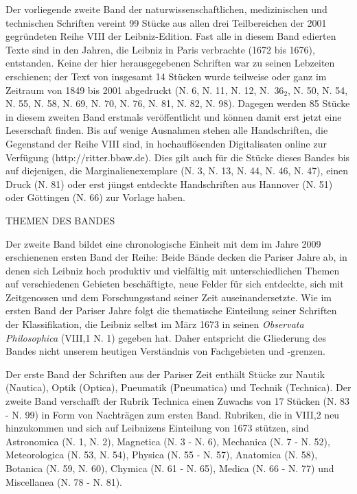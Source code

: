 \thispagestyle{empty}
{\vrule height 0mm depth 30mm width 0mm}
\vspace*{2em}
\par\noindent Der vorliegende zweite Band der naturwissenschaftlichen, medizinischen und technischen Schriften vereint 99 Stücke aus allen drei Teilbereichen der 2001 gegründeten Reihe VIII der Leibniz-Edition. Fast alle in diesem Band edierten Texte sind in den Jahren, die Leibniz in Paris verbrachte (1672 bis 1676), entstanden. Keine der hier herausgegebenen Schriften war zu seinen Lebzeiten erschienen; der Text von insgesamt 14 Stücken wurde teilweise oder ganz im Zeitraum von 1849 bis 2001 abgedruckt (N. 6, N. 11, N. 12, N.~$36_2$, N. 50, N. 54, N. 55, N. 58, N. 69, N. 70, N. 76, N. 81, N. 82, N. 98). Dagegen werden 85 Stücke in diesem zweiten Band erstmals veröffentlicht und können damit erst jetzt eine Leserschaft finden. Bis auf wenige Ausnahmen stehen alle Handschriften, die Gegenstand der Reihe VIII sind, in hochauflösenden Digitalisaten online zur Verfügung (http://ritter.bbaw.de). Dies gilt auch für die Stücke dieses Bandes bis auf diejenigen, die Marginalienexemplare (N. 3, N. 13, N. 44, N. 46, N. 47), einen Druck (N. 81) oder erst jüngst entdeckte Handschriften aus Hannover (N. 51) oder Göttingen (N. 66) zur Vorlage haben.
\par\vspace{6.0ex}
\noindent
\noindent\uppercase{Themen des Bandes}
\par
\vspace{1.0ex}
\noindent
Der zweite Band bildet eine chronologische Einheit mit dem im Jahre 2009 erschienenen ersten Band der Reihe: Beide Bände decken die Pariser Jahre ab, in denen sich Leibniz hoch produktiv und vielfältig mit unterschiedlichen Themen auf verschiedenen Gebieten beschäftigte, neue Felder für sich entdeckte, sich mit Zeitgenossen und dem Forschungsstand seiner Zeit auseinandersetzte. Wie im ersten Band der Pariser Jahre folgt die thematische Einteilung seiner Schriften der Klassifikation, die Leibniz selbst im März 1673 in seinen \textit{Observata Philosophica} (VIII,1 N. 1) gegeben hat. Daher entspricht die Gliederung des Bandes nicht unserem heutigen Verständnis von Fachgebieten und -grenzen.\par 
\newpage
Der erste Band der Schriften aus der Pariser Zeit enthält Stücke zur Nautik (Nautica), Optik (Optica), Pneumatik (Pneumatica) und Technik (Technica). Der zweite Band verschafft der Rubrik Technica einen Zuwachs von 17 Stücken (N. 83 - N. 99) in Form von Nachträgen zum ersten Band. Rubriken, die in VIII,2 neu hinzukommen und sich auf Leibnizens Einteilung von 1673 stützen, sind Astronomica (N. 1, N. 2), Magnetica (N. 3 - N. 6), Mechanica (N. 7 - N. 52), Meteorologica (N. 53, N. 54), Physica (N. 55 - N. 57), Anatomica (N. 58), Botanica (N. 59, N. 60), Chymica (N. 61 - N. 65), Medica (N. 66 - N. 77) und Miscellanea (N. 78 - N. 81).\par
